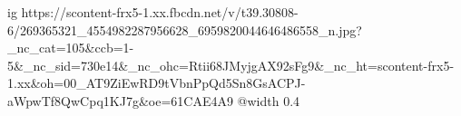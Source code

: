 
 
 
 
 

\ifcmt
  ig https://scontent-frx5-1.xx.fbcdn.net/v/t39.30808-6/269365321_4554982287956628_6959820044646486558_n.jpg?_nc_cat=105&ccb=1-5&_nc_sid=730e14&_nc_ohc=Rtii68JMyjgAX92sFg9&_nc_ht=scontent-frx5-1.xx&oh=00_AT9ZiEwRD9tVbnPpQd5Sn8GsACPJ-aWpwTf8QwCpq1KJ7g&oe=61CAE4A9
  @width 0.4
\fi

